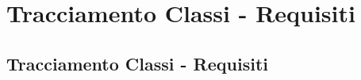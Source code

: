 \section{Tracciamento Classi - Requisiti}
\subsection{Tracciamento Classi - Requisiti}
\normalsize
%
%

\newpage